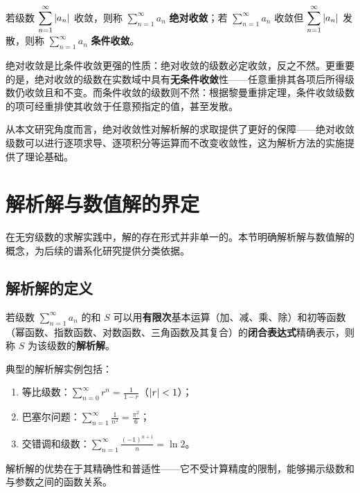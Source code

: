 \begin{definition}
若级数 $\displaystyle \sum_{n=1}^{\infty} \left|a_n\right|$ 收敛，则称 $\displaystyle \sum_{n=1}^{\infty} a_n$ \textbf{绝对收敛}；若 $\displaystyle \sum_{n=1}^{\infty} a_n$ 收敛但 $\displaystyle \sum_{n=1}^{\infty} \left|a_n\right|$ 发散，则称 $\displaystyle \sum_{n=1}^{\infty} a_n$ \textbf{条件收敛}。
\end{definition}

绝对收敛是比条件收敛更强的性质：绝对收敛的级数必定收敛，反之不然。更重要的是，绝对收敛的级数在实数域中具有\textbf{无条件收敛}性——任意重排其各项后所得级数仍收敛且和不变。而条件收敛的级数则不然：根据黎曼重排定理，条件收敛级数的项可经重排使其收敛于任意预指定的值，甚至发散。

从本文研究角度而言，绝对收敛性对解析解的求取提供了更好的保障——绝对收敛级数可以进行逐项求导、逐项积分等运算而不改变收敛性，这为解析方法的实施提供了理论基础。

\section{解析解与数值解的界定}

在无穷级数的求解实践中，解的存在形式并非单一的。本节明确解析解与数值解的概念，为后续的谱系化研究提供分类依据。

\subsection{解析解的定义}

\begin{definition}
若级数 $\displaystyle \sum_{n=1}^{\infty} a_n$ 的和 $S$ 可以用\textbf{有限次}基本运算（加、减、乘、除）和初等函数（幂函数、指数函数、对数函数、三角函数及其复合）的\textbf{闭合表达式}精确表示，则称 $S$ 为该级数的\textbf{解析解}。
\end{definition}

典型的解析解实例包括：
\begin{enumerate}[label=（\arabic*）]
  \item 等比级数：$\displaystyle \sum_{n=0}^{\infty} r^n = \frac{1}{1-r}$（$\left|r\right| < 1$）；
  \item 巴塞尔问题：$\displaystyle \sum_{n=1}^{\infty} \frac{1}{n^2} = \frac{\pi^2}{6}$；
  \item 交错调和级数：$\displaystyle \sum_{n=1}^{\infty} \frac{(-1)^{n+1}}{n} = \ln 2$。
\end{enumerate}

解析解的优势在于其精确性和普适性——它不受计算精度的限制，能够揭示级数和与参数之间的函数关系。

